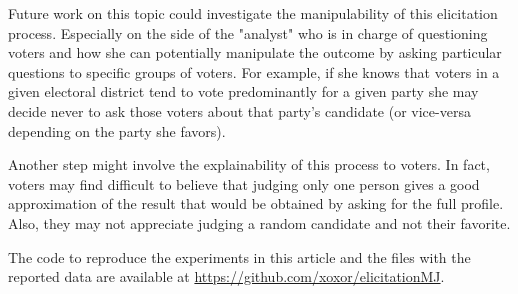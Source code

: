 		Future work on this topic could investigate the manipulability of this elicitation process. Especially on the side of the "analyst" who is in charge of questioning voters and how she can potentially manipulate the outcome by asking particular questions to specific groups of voters. For example, if she knows that voters in a given electoral district tend to vote predominantly for a given party she may decide never to ask those voters about that party's candidate (or vice-versa depending on the party she favors). 
		
		Another step might involve the explainability of this process to voters. In fact, voters may find difficult to believe that judging only one person gives a good approximation of the result that would be obtained by asking for the full profile. Also, they may not appreciate judging a random candidate and not their favorite.
		
		The code to reproduce the experiments in this article and the files with the reported data are available at \url{https://github.com/xoxor/elicitationMJ}.
	